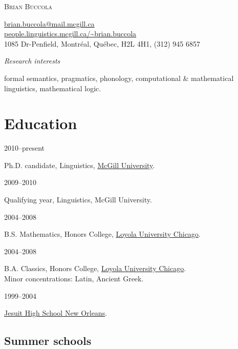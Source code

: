 \documentclass[11pt,letterpaper]{article}
\newcommand{\name}{Brian Buccola}
\newcommand{\cvitem}[2]{%
  \begin{minipage}[t]{0.24\textwidth}
    #1 %
  \end{minipage}
  \hfill
  \begin{minipage}[t]{0.74\textwidth}
    #2 %
  \end{minipage}
}
\begin{document}

\begin{minipage}[b]{0.43\textwidth}
  {\Huge\scshape \name}
\end{minipage}
\hfill
\begin{minipage}[b]{0.55\textwidth}
  \begin{flushright}
    \href{mailto:brian.buccola@mail.mcgill.ca}{\ttfamily\small
      brian.buccola@mail.mcgill.ca}                               \\
    \href{http://people.linguistics.mcgill.ca/}{\ttfamily\small
    people.linguistics.mcgill.ca/\textasciitilde{}brian.buccola}  \\
    {\footnotesize 1085 Dr-Penfield, Montr\'{e}al, Qu\'{e}bec, H2L 4H1, (312)
  945 6857}
  \end{flushright}
\end{minipage}

\vspace{-1.25em}

\hrulefill

\cvitem{\textit{Research interests}}{formal semantics, pragmatics, phonology,
computational \& mathematical linguistics, mathematical logic.}






\section*{Education}

\cvitem{2010--present}{Ph.D. candidate, Linguistics,
  \href{http://www.mcgill.ca/}{McGill University}.}

\cvitem{2009--2010}{Qualifying year, Linguistics, McGill University.}

\cvitem{2004--2008}{B.S. Mathematics, Honors College,
  \href{http://www.luc.edu/}{Loyola University Chicago}.}

\cvitem{2004--2008}{B.A. Classics, Honors College,
  \href{http://www.luc.edu/}{Loyola University Chicago}. \\ {\footnotesize Minor
  concentrations: Latin, Ancient Greek.}}

\cvitem{1999--2004}{\href{http://www.jesuitnola.org/}{Jesuit High School New
Orleans}.}

\subsection*{Summer schools}
\end{document}
